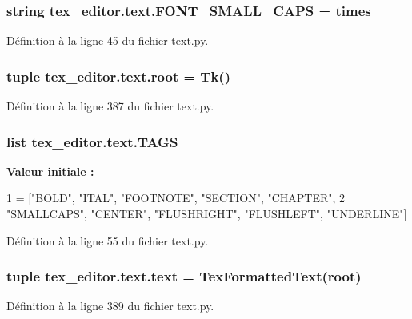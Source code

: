 \subsubsection[{F\+O\+N\+T\+\_\+\+S\+M\+A\+L\+L\+\_\+\+C\+A\+P\+S}]{\setlength{\rightskip}{0pt plus 5cm}string tex\+\_\+editor.\+text.\+F\+O\+N\+T\+\_\+\+S\+M\+A\+L\+L\+\_\+\+C\+A\+P\+S = \textquotesingle{}times\textquotesingle{}}\label{namespacetex__editor_1_1text_ae74d39eb8742994b41f56541bc8bae6c}


Définition à la ligne 45 du fichier text.\+py.

\hypertarget{namespacetex__editor_1_1text_ae1f9e270c1a1a3a86e7eb78754c66079}{}
\subsubsection[{root}]{\setlength{\rightskip}{0pt plus 5cm}tuple tex\+\_\+editor.\+text.\+root = Tk()}\label{namespacetex__editor_1_1text_ae1f9e270c1a1a3a86e7eb78754c66079}


Définition à la ligne 387 du fichier text.\+py.

\hypertarget{namespacetex__editor_1_1text_ab9d862754bd7eda7e4b7b806d4d3e04e}{}
\subsubsection[{T\+A\+G\+S}]{\setlength{\rightskip}{0pt plus 5cm}list tex\+\_\+editor.\+text.\+T\+A\+G\+S}\label{namespacetex__editor_1_1text_ab9d862754bd7eda7e4b7b806d4d3e04e}
{\bfseries Valeur initiale \+:}
\begin{DoxyCode}
1 = [\textcolor{stringliteral}{"BOLD"}, \textcolor{stringliteral}{"ITAL"}, \textcolor{stringliteral}{"FOOTNOTE"}, \textcolor{stringliteral}{"SECTION"}, \textcolor{stringliteral}{"CHAPTER"},
2     \textcolor{stringliteral}{"SMALLCAPS"}, \textcolor{stringliteral}{"CENTER"}, \textcolor{stringliteral}{"FLUSHRIGHT"}, \textcolor{stringliteral}{"FLUSHLEFT"}, \textcolor{stringliteral}{"UNDERLINE"}]
\end{DoxyCode}


Définition à la ligne 55 du fichier text.\+py.

\hypertarget{namespacetex__editor_1_1text_a9ea0b7df59ef9eead26c31eb11278788}{}
\subsubsection[{text}]{\setlength{\rightskip}{0pt plus 5cm}tuple tex\+\_\+editor.\+text.\+text = {\bf Tex\+Formatted\+Text}({\bf root})}\label{namespacetex__editor_1_1text_a9ea0b7df59ef9eead26c31eb11278788}


Définition à la ligne 389 du fichier text.\+py.

